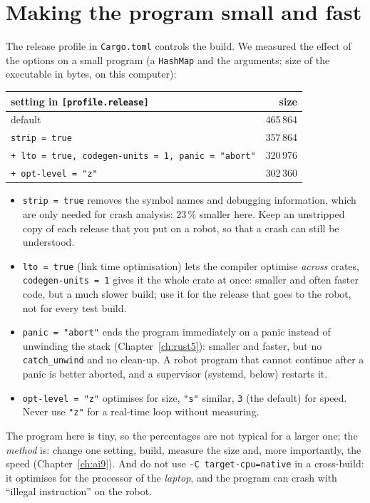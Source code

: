 \section*{Making the program small and fast}
The release profile in \verb!Cargo.toml! controls the build. We measured the effect of the options on a small program (a \verb!HashMap! and the arguments; size of the executable in bytes, on this computer):
\begin{center}
\renewcommand{\arraystretch}{1.2}
\begin{tabular}{lr}
\textbf{setting in \texttt{[profile.release]}} & \textbf{size}\\ \hline
default & 465\,864\\
\verb!strip = true! & 357\,864\\
\verb!+ lto = true, codegen-units = 1, panic = "abort"! & 320\,976\\
\verb!+ opt-level = "z"! & 302\,360\\
\end{tabular}
\end{center}
\begin{itemize}[nosep]
\item \verb!strip = true! removes the symbol names and debugging information, which are only needed for crash analysis: $23\,\%$ smaller here. Keep an unstripped copy of each release that you put on a robot, so that a crash can still be understood.
\item \verb!lto = true! (link time optimisation) lets the compiler optimise \emph{across} crates, \verb!codegen-units = 1! gives it the whole crate at once: smaller and often faster code, but a much slower build; use it for the release that goes to the robot, not for every test build.
\item \verb!panic = "abort"! ends the program immediately on a panic instead of unwinding the stack (Chapter~\ref{ch:rust5}): smaller and faster, but no \verb!catch_unwind! and no clean-up. A robot program that cannot continue after a panic is better aborted, and a supervisor (systemd, below) restarts it.
\item \verb!opt-level = "z"! optimises for size, \verb!"s"! similar, \verb!3! (the default) for speed. Never use \verb!"z"! for a real-time loop without measuring.
\end{itemize}
The program here is tiny, so the percentages are not typical for a larger one; the \emph{method} is: change one setting, build, measure the size and, more importantly, the speed (Chapter~\ref{ch:ai9}). And do not use \verb!-C target-cpu=native! in a cross-build: it optimises for the processor of the \emph{laptop}, and the program can crash with ``illegal instruction'' on the robot.

